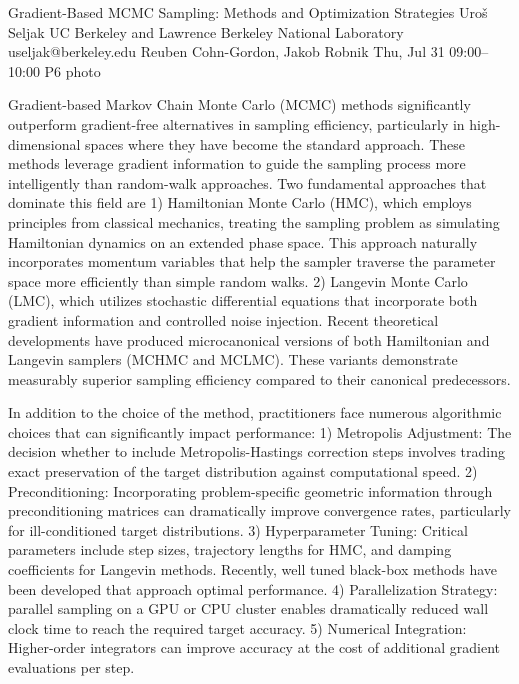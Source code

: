 \documentclass[12pt,lettersize,oneside]{book} %
\begin{document}
\clearpage
\begin{talk}
  {Gradient-Based MCMC Sampling: Methods and Optimization Strategies}%
  {Uro\v s Seljak}%
  {UC Berkeley and Lawrence Berkeley National Laboratory}%
  {useljak@berkeley.edu}%
  {Reuben Cohn-Gordon, Jakob Robnik}%
  {}%
  {Thu, Jul 31 09:00--10:00}%
  {P6}%
  {photo}%
  
    
   
\vspace{-5ex}Gradient-based Markov Chain Monte Carlo (MCMC) methods significantly outperform gradient-free alternatives in sampling efficiency, particularly in high-dimensional spaces where they have become the standard approach. These methods leverage gradient information to guide the sampling process more intelligently than random-walk approaches.
Two fundamental approaches that dominate this field are 1)
Hamiltonian Monte Carlo (HMC), which  employs principles from classical mechanics, treating the sampling problem as simulating Hamiltonian dynamics on an extended phase space. This approach naturally incorporates momentum variables that help the sampler traverse the parameter space more efficiently than simple random walks. 2)
Langevin Monte Carlo (LMC), which utilizes stochastic differential equations that incorporate both gradient information and controlled noise injection. 
Recent theoretical developments have produced microcanonical versions of both Hamiltonian and Langevin samplers (MCHMC and MCLMC). These variants demonstrate measurably superior sampling efficiency compared to their canonical predecessors.

In addition to the choice of 
the method, 
practitioners face numerous algorithmic choices that can significantly impact performance:
1) Metropolis Adjustment: The decision whether to include Metropolis-Hastings correction steps involves trading exact preservation of the target distribution against computational speed.
2) Preconditioning: Incorporating problem-specific geometric information through preconditioning matrices can dramatically improve convergence rates, particularly for ill-conditioned target distributions.
3) Hyperparameter Tuning: Critical parameters include step sizes, trajectory lengths for HMC, and damping coefficients for Langevin methods. Recently, well tuned black-box methods have been developed that approach optimal performance. 
4) Parallelization Strategy: parallel sampling on a GPU or CPU cluster enables dramatically reduced wall clock time to reach the required target accuracy. 
5) Numerical Integration: Higher-order integrators can improve accuracy at the cost of additional gradient evaluations per step.


\end{talk}
\end{document}
